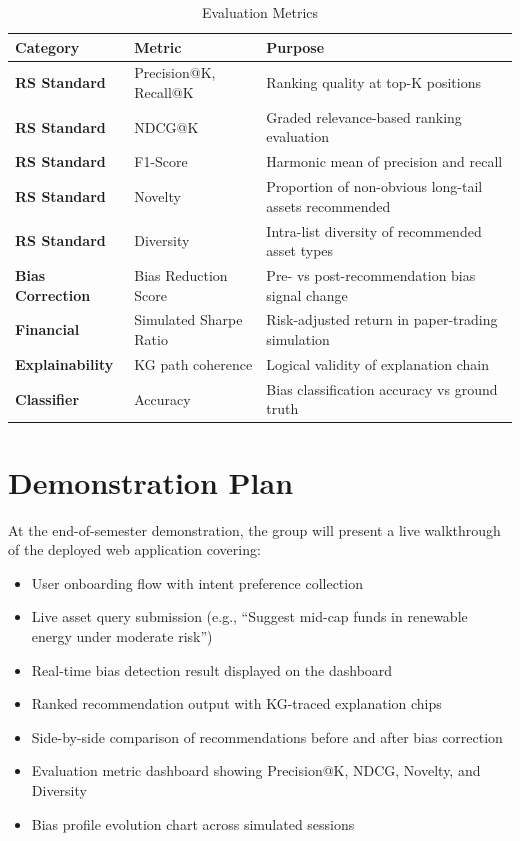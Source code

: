 \documentclass[12pt, a4paper]{article}
\begin{document}
\begin{table}[H]
\centering
\caption{Evaluation Metrics}
\renewcommand{\arraystretch}{1.4}
\begin{tabularx}{\textwidth}{>{\bfseries}llX}
\toprule
\textbf{Category} & \textbf{Metric} & \textbf{Purpose} \\
\midrule
RS Standard        & Precision@K, Recall@K & Ranking quality at top-K positions \\
RS Standard        & NDCG@K                & Graded relevance-based ranking evaluation \\
RS Standard        & F1-Score              & Harmonic mean of precision and recall \\
RS Standard        & Novelty               & Proportion of non-obvious long-tail assets recommended \\
RS Standard        & Diversity             & Intra-list diversity of recommended asset types \\
Bias Correction    & Bias Reduction Score  & Pre- vs post-recommendation bias signal change \\
Financial          & Simulated Sharpe Ratio& Risk-adjusted return in paper-trading simulation \\
Explainability     & KG path coherence     & Logical validity of explanation chain \\
Classifier         & Accuracy              & Bias classification accuracy vs ground truth \\
\bottomrule
\end{tabularx}
\end{table}

\section{Demonstration Plan}

At the end-of-semester demonstration, the group will present a live walkthrough of the
deployed web application covering:

\begin{itemize}[leftmargin=1.5cm]
  \item User onboarding flow with intent preference collection
  \item Live asset query submission (e.g., ``Suggest mid-cap funds in renewable energy under moderate risk'')
  \item Real-time bias detection result displayed on the dashboard
  \item Ranked recommendation output with KG-traced explanation chips
  \item Side-by-side comparison of recommendations before and after bias correction
  \item Evaluation metric dashboard showing Precision@K, NDCG, Novelty, and Diversity
  \item Bias profile evolution chart across simulated sessions
\end{itemize}
\end{document}

